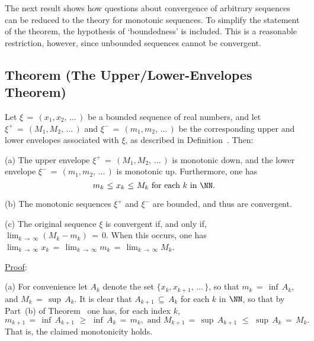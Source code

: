 \V
\V

        The next result shows how questions about convergence of arbitrary sequences can be reduced to the theory for monotonic sequences.
    To simplify the statement of the theorem, the hypothesis of `boundedness' is included.
    This is a reasonable restriction, however, since unbounded sequences cannot be convergent.

\V

            \subsection{\small{\bf Theorem} (The Upper/Lower-Envelopes Theorem)}
            \label{ThmC50.60}

        Let ${\xi} \,=\, (x_{1},x_{2},\,{\ldots}\,)$ be a bounded sequence of real numbers,
    and let ${\xi}^{+} \,=\, (M_{1},M_{2},\,{\ldots}\,)$ and ${\xi}^{-} \,=\, (m_{1},m_{2},\,{\ldots}\,)$
    be the corresponding upper and lower envelopes associated with ${\xi}$, as described in Definition~. Then:

        (a) The upper envelope ${\xi}^{+} \,=\, (M_{1},M_{2},\,{\ldots}\,)$ is monotonic down,
    and the lower envelope ${\xi}^{-} \,=\, (m_{1},m_{2},\,{\ldots}\,)$ is monotonic up.
    Furthermore, one has
        \begin{displaymath}
        m_{k}\,\,{\leq}\,\,x_{k}\,\,{\leq}\,\,M_{k} \mbox{ for each $k$ in ${\NN}$}.
        \end{displaymath}

\V

        (b) The monotonic sequences ${\xi}^{+}$ and ${\xi}^{-}$ are bounded, and thus are convergent.

\V

        (c) The original sequence ${\xi}$ is convergent if, and only if, $\lim_{k \,{\rightarrow}\, {\infty}} (M_{k}-m_{k}) \,=\, 0$.
    When this occurs, one has $\lim_{k \,{\rightarrow}\, {\infty}} x_{k} \,=\, \lim_{k \,{\rightarrow}\, {\infty}} m_{k} \,=\, \lim_{k \,{\rightarrow}\, {\infty}} M_{k}$.

\V

         \underline{Proof}:

\V

        (a) For convenience let $A_{k}$ denote the set $\{x_{k},x_{k+1},\,{\ldots}\,\}$,
    so that $m_{k} \,=\, {\inf}\,A_{k}$, and $M_{k} \,=\, {\sup}\,A_{k}$.
    It is clear that $A_{k+1} \,{\subseteq}\, A_{k}$ for each $k$ in ${\NN}$, so that by Part~(b) of Theorem~ one has, for each index $k$,
        \begin{displaymath}
        m_{k+1} \,=\, {\inf}\,A_{k+1}\,\,{\geq}\,\,{\inf}\,A_{k} \,=\, m_{k},
    \mbox{ and } 
        M_{k+1} \,=\, {\sup}\,A_{k+1}\,\,{\leq}\,\,{\sup}\,A_{k} \,=\, M_{k}.
        \end{displaymath}
    That is, the claimed monotonicity holds.

